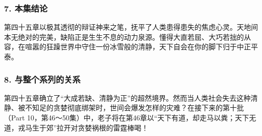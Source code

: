 \subsubsection{7. 本集结论}
第四十五章以极其透彻的辩证神来之笔，抚平了人类患得患失的焦虑心灵。天地间本无绝对的完美，缺陷正是生生不息的动力泉源。懂得大直若屈、大巧若拙的从容，在喧嚣的狂躁世界中守住一份冰雪般的清静，天下自会在你的脚下归于中正平泰。

\subsubsection{8. 与整个系列的关系}
第四十五章确立了“大成若缺、清静为正”的超然境界。然而当人类社会失去这种清静、被不知足的贪婪彻底绑架时，世间会爆发怎样的灾难？在接下来的第十批（Part 10，第46～50集）中，老子将在第46章以“天下有道，却走马以粪；天下无道，戎马生于郊”拉开对贪婪祸根的雷霆棒喝！